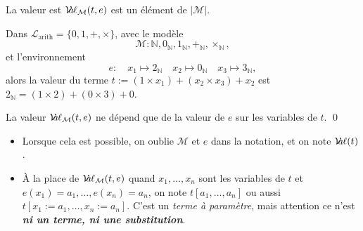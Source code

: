 \documentclass[./main]{subfiles}
\begin{document}
  \begin{rmk}
    La valeur est $\mathcal{V}\hspace{-3.5pt}a\hspace{-0.5pt}\ell_\mathcal{M}(t, e)$ est un élément de $|\mathcal{M}|$.
  \end{rmk}

  \begin{exm}
    Dans $\mathcal{L}_\mathrm{arith} = \{0, 1, +, \times\}$, avec le modèle \[
    \mathcal{M} : \mathds{N}, 0_\mathds{N}, 1_\mathds{N}, +_\mathds{N}, \times_\mathds{N}
    ,\] et l'environnement \[
    e : \quad x_1 \mapsto 2_\mathds{N} \quad x_2 \mapsto 0_\mathds{N} \quad x_3 \mapsto 3_\mathds{N}
    ,\] 
    alors la valeur du terme $t := (1 \times x_1) + (x_2 \times x_3) + x_2$ est $2_\mathds{N} = (1 \times 2) + (0 \times 3) + 0 $.
  \end{exm}

  \begin{lem}
    La valeur $\mathcal{V}\hspace{-3.5pt}a\hspace{-0.5pt}\ell_\mathcal{M}(t, e)$ ne dépend que de la valeur de $e$ sur les variables de $t$.
    \qed
  \end{lem}

  \begin{nota}
    \begin{itemize}
      \item Lorsque cela est possible, on oublie $\mathcal{M}$ et $e$ dans la notation, et on note $\mathcal{V}\hspace{-3.5pt}a\hspace{-0.5pt}\ell(t)$.
      \item À la place de  $\mathcal{V}\hspace{-3.5pt}a\hspace{-0.5pt}\ell_\mathcal{M}(t,e)$  quand $x_1, \ldots, x_n$ sont les variables de $t$ et $e(x_1) = a_1, \ldots, e(x_n) = a_n$, on note $t[a_1, \ldots, a_n]$ ou aussi~$t[x_1 := a_1, \ldots, x_n := a_n]$.
        C'est un \textit{terme à paramètre}, mais attention ce n'est \textit{\textbf{ni un terme, ni une substitution}}.
    \end{itemize}
  \end{nota}
\end{document}
